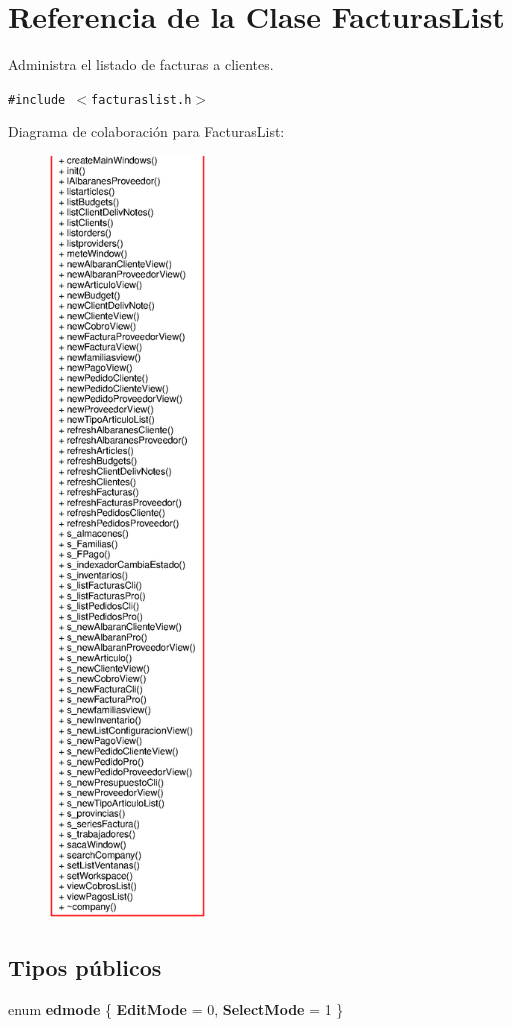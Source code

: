 \section{Referencia de la Clase Facturas\-List}
\label{classFacturasList}
Administra el listado de facturas a clientes.  


{\tt \#include $<$facturaslist.h$>$}

Diagrama de colaboraci\'{o}n para Facturas\-List:\begin{figure}[H]
\begin{center}
\leavevmode
\includegraphics[width=119pt]{classFacturasList__coll__graph}
\end{center}
\end{figure}
\subsection*{Tipos p\'{u}blicos}
\begin{CompactItemize}
\item 
enum {\bf edmode} \{ {\bf Edit\-Mode} =  0, 
{\bf Select\-Mode} =  1
 \}
\end{CompactItemize}
